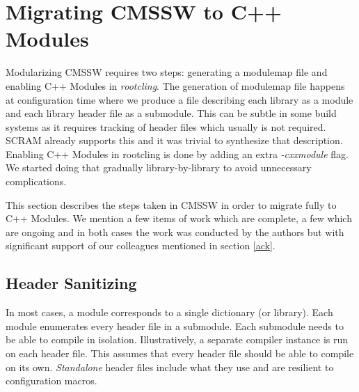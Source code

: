 \documentclass[12pt]{iopart}
\begin{document}
\section{Migrating CMSSW to C++ Modules}
\label{migration}

Modularizing CMSSW requires two steps: generating a modulemap file and enabling C++ Modules in \textit{rootcling}. The generation of modulemap file happens at configuration time where we produce a file describing each library as a module and each library header file as a submodule. This can be subtle in some build systems as it requires tracking of header files which usually is not required. SCRAM already supports this and it was trivial to synthesize that description. Enabling C++ Modules in rootcling is done by adding an extra \textit{-cxxmodule} flag. We started doing that gradually library-by-library to avoid unnecessary complications.

This section describes the steps taken in CMSSW in order to migrate fully to C++ Modules. We mention a few items of work which are complete, a few which are ongoing and in both cases the work was conducted by the authors but with significant support of our colleagues mentioned in section \ref{ack}.

\subsection{Header Sanitizing}
In most cases, a module corresponds to a single dictionary (or library). Each module enumerates every header file in a submodule. Each submodule needs to be able to compile in isolation. Illustratively, a separate compiler instance is run on each header file. This assumes that every header file should be able to compile on its own. \textit{Standalone} header files include what they use and are resilient to configuration macros.
\end{document}
